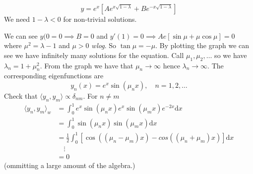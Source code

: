\documentclass{article}
\begin{document}
\[
	y=e^x\left[Ae^{x\sqrt{1-\lambda}}+Be^{-x\sqrt{1-\lambda}}\right]
\]
We need $ 1-\lambda < 0 $ for non-trivial solutions.\par
We can see $ y(0=0\implies B=0 $ and $ y'(1)=0\implies Ae\left[\sin \mu+\mu\cos\mu\right]=0 $ where $ \mu^2=\lambda -1 $ and $ \mu>0 $ \textit{wlog}. So $ \tan\mu=-\mu $. By plotting the graph we can see we have infinitely many solutions for the equation. Call $ \mu_1,\mu_2,\dots $ so we have $ \lambda_n=1+\mu_n^2 $. From the graph we have that $ \mu_n\to\infty $ hence $ \lambda_n\to \infty $. The corresponding eigenfunctions are
\[
	y_n(x)=e^x\sin(\mu_nx),\quad n=1,2,\dots
\]
Check that $ \langle y_n,y_m\rangle\propto \delta_{nm} $. For $ n\ne m $
\begin{align*}
	\langle y_n,y_m\rangle_w &= \int_0^1e^x\sin(\mu_n x)e^x\sin(\mu_m x)e^{-2x}\mathrm dx\\
				 &= \int_0^1 \sin(\mu_n x)\sin(\mu_m x)\mathrm dx\\
				 &=\frac 12\int_0^1\left[\cos((\mu_n-\mu_m)x)-cos((\mu_n+\mu_m)x)\right]\mathrm dx\\
				 &\quad\vdots\\
				 &= 0
\end{align*}
(ommitting a large amount of the algebra.)
\end{document}
